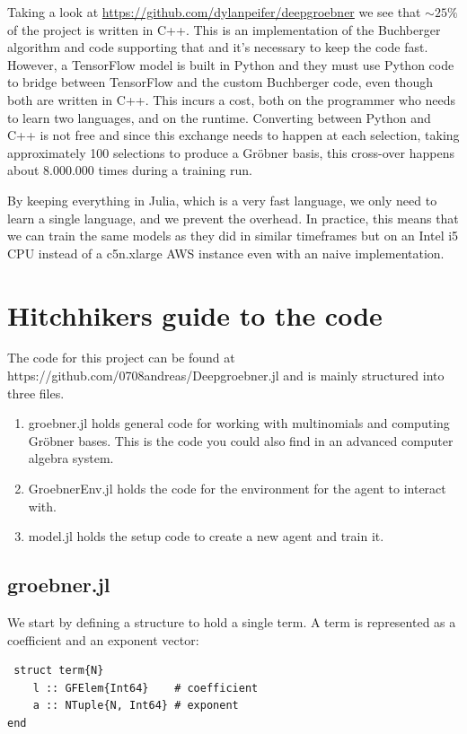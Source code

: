 \documentclass{article}
\theoremstyle{changedot}
\theoremstyle{changedotbreak}
\theoremstyle{nonumberplain}
\begin{document}
Taking a look at \url{https://github.com/dylanpeifer/deepgroebner} we see that $\sim 25\%$ of the project is written in C++. This is an implementation of the Buchberger algorithm and code supporting that and it's necessary to keep the code fast. However, a TensorFlow model is built in Python and they must use Python code to bridge between TensorFlow and the custom Buchberger code, even though both are written in C++. This incurs a cost, both on the programmer who needs to learn two languages, and on the runtime. Converting between Python and C++ is not free and since this exchange needs to happen at each selection, taking approximately 100 selections to produce a Gröbner basis, this cross-over happens about 8.000.000 times during a training run.

By keeping everything in Julia, which is a very fast language, we only need to learn a single language, and we prevent the overhead. In practice, this means that we can train the same models as they did in similar timeframes but on an Intel i5 CPU instead of a c5n.xlarge AWS instance even with an naive implementation.


\section{Hitchhikers guide to the code}
The code for this project can be found at https://github.com/0708andreas/Deepgroebner.jl and is mainly structured into three files.

\begin{enumerate}
  \item groebner.jl holds general code for working with multinomials and computing Gröbner bases. This is the code you could also find in an advanced computer algebra system.

  \item GroebnerEnv.jl holds the code for the environment for the agent to interact with.

  \item model.jl holds the setup code to create a new agent and train it.
    
\end{enumerate}

\subsection{groebner.jl}

We start by defining a structure to hold a single term. A term is represented as a coefficient and an exponent vector:
\begin{verbatim}
 struct term{N}
    l :: GFElem{Int64}    # coefficient
    a :: NTuple{N, Int64} # exponent
end
\end{verbatim}
\end{document}
